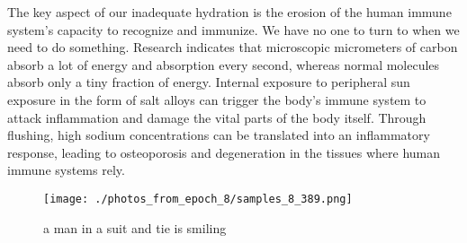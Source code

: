 \documentclass{article}%
\begin{document}
The key aspect of our inadequate hydration is the erosion of the human immune system's capacity to recognize and immunize. We have no one to turn to when we need to do something. Research indicates that microscopic micrometers of carbon absorb a lot of energy and absorption every second, whereas normal molecules absorb only a tiny fraction of energy. Internal exposure to peripheral sun exposure in the form of salt alloys can trigger the body's immune system to attack inflammation and damage the vital parts of the body itself. Through flushing, high sodium concentrations can be translated into an inflammatory response, leading to osteoporosis and degeneration in the tissues where human immune systems rely.\newline%

%


\begin{figure}[h!]%
\centering%
\texttt{[image: ./photos\_from\_epoch\_8/samples\_8\_389.png]}%
\caption{a man in a suit and tie is smiling}%
\end{figure}

%
\end{document}
